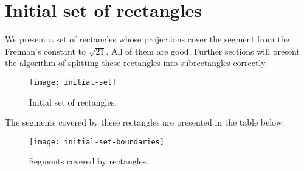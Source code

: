 \section{Initial set of rectangles}

We present a set of rectangles
whose projections cover the segment from the Freiman's constant to $\sqrt{21}$.
All of them are good.
Further sections will present the algorithm of splitting these rectangles into subrectangles correctly.

\begin{figure}[H]
	\centering
	\texttt{[image: initial-set]}
	\caption{Initial set of rectangles.}
	\label{initial-set}
\end{figure}

The segments covered by these rectangles are presented in the table below:

\begin{figure}[H]
	\centering
	\texttt{[image: initial-set-boundaries]}
	\caption{Segments covered by rectangles.}
	\label{initial-set-table}
\end{figure}